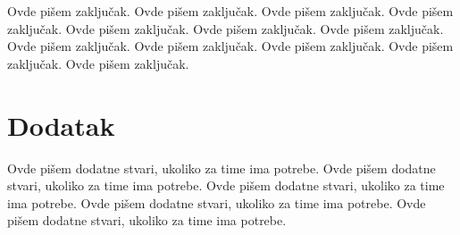 \documentclass[a4paper]{article}
\begin{document}
Ovde pišem zaključak. 
Ovde pišem zaključak. 
Ovde pišem zaključak. 
Ovde pišem zaključak. 
Ovde pišem zaključak. 
Ovde pišem zaključak. 
Ovde pišem zaključak. 
Ovde pišem zaključak. 
Ovde pišem zaključak. 
Ovde pišem zaključak. 
Ovde pišem zaključak. 
Ovde pišem zaključak. 


\appendix
 


\appendix
\section{Dodatak}
Ovde pišem dodatne stvari, ukoliko za time ima potrebe.
Ovde pišem dodatne stvari, ukoliko za time ima potrebe.
Ovde pišem dodatne stvari, ukoliko za time ima potrebe.
Ovde pišem dodatne stvari, ukoliko za time ima potrebe.
Ovde pišem dodatne stvari, ukoliko za time ima potrebe.
\end{document}
